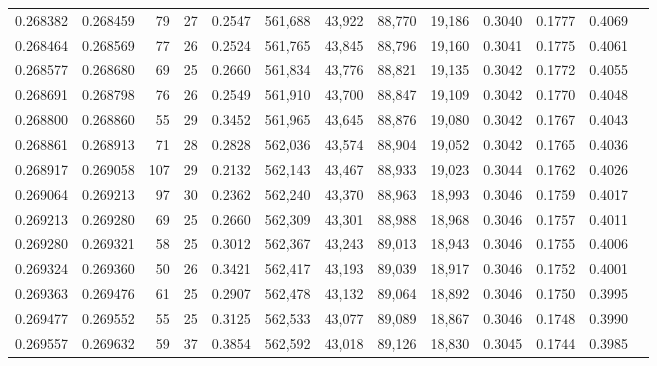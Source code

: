 \begin{tabular}{rrrrrrrrrrrrr}
0.268382 & 0.268459 &  79 &  27 &                                     0.2547 & 561,688 &  43,922 &  88,770 &  19,186 & 0.3040 & 0.1777 & 0.4069 \\
0.268464 & 0.268569 &  77 &  26 &                                     0.2524 & 561,765 &  43,845 &  88,796 &  19,160 & 0.3041 & 0.1775 & 0.4061 \\
0.268577 & 0.268680 &  69 &  25 &                                     0.2660 & 561,834 &  43,776 &  88,821 &  19,135 & 0.3042 & 0.1772 & 0.4055 \\
0.268691 & 0.268798 &  76 &  26 &                                     0.2549 & 561,910 &  43,700 &  88,847 &  19,109 & 0.3042 & 0.1770 & 0.4048 \\
0.268800 & 0.268860 &  55 &  29 &                                     0.3452 & 561,965 &  43,645 &  88,876 &  19,080 & 0.3042 & 0.1767 & 0.4043 \\
0.268861 & 0.268913 &  71 &  28 &                                     0.2828 & 562,036 &  43,574 &  88,904 &  19,052 & 0.3042 & 0.1765 & 0.4036 \\
0.268917 & 0.269058 & 107 &  29 &                                     0.2132 & 562,143 &  43,467 &  88,933 &  19,023 & 0.3044 & 0.1762 & 0.4026 \\
0.269064 & 0.269213 &  97 &  30 &                                     0.2362 & 562,240 &  43,370 &  88,963 &  18,993 & 0.3046 & 0.1759 & 0.4017 \\
0.269213 & 0.269280 &  69 &  25 &                                     0.2660 & 562,309 &  43,301 &  88,988 &  18,968 & 0.3046 & 0.1757 & 0.4011 \\
0.269280 & 0.269321 &  58 &  25 &                                     0.3012 & 562,367 &  43,243 &  89,013 &  18,943 & 0.3046 & 0.1755 & 0.4006 \\
0.269324 & 0.269360 &  50 &  26 &                                     0.3421 & 562,417 &  43,193 &  89,039 &  18,917 & 0.3046 & 0.1752 & 0.4001 \\
0.269363 & 0.269476 &  61 &  25 &                                     0.2907 & 562,478 &  43,132 &  89,064 &  18,892 & 0.3046 & 0.1750 & 0.3995 \\
0.269477 & 0.269552 &  55 &  25 &                                     0.3125 & 562,533 &  43,077 &  89,089 &  18,867 & 0.3046 & 0.1748 & 0.3990 \\
0.269557 & 0.269632 &  59 &  37 &                                     0.3854 & 562,592 &  43,018 &  89,126 &  18,830 & 0.3045 & 0.1744 & 0.3985 \\

\end{tabular}
